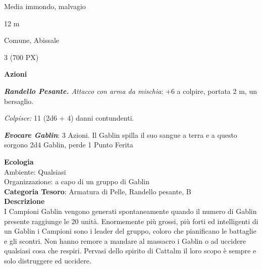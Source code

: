 \begin{multicols}{2}
{
\begin{description}[noitemsep, topsep=0pt, parsep=0pt, partopsep=0pt, itemsep=1pt, leftmargin=2.35cm,  labelwidth=2.2cm, itemindent=0cm, listparindent=0pt] %
\setlength{\baselineskip}{10pt}
\item[\textbf{Taglia/Tipo}] Media immondo, malvagio
\item[\textbf{Caratt.}] 
\item[\textbf{Punti Ferita}] 
\item[\textbf{Movimento}] 12 m
\item[\textbf{Tiri Salvez.}] 
\item[\textbf{Sensi}] 
\item[\textbf{Linguaggi}] Comune, Abissale
\item[\textbf{Sfida}] 3 (700 PX)
\end{description}
\smallskip

\textbf{Azioni}

\emph{\textbf{Randello Pesante.} Attacco con arma da mischia}: +6 a colpire, portata 2 m, un bersaglio.

\emph{Colpisce:} 11 (2d6 + 4) danni contundenti.

\emph{\textbf{Evocare Gablin}}: 3 Azioni. Il Gablin spilla il suo sangue a terra e a questo sorgono 2d4 Gablin, perde 1 Punto Ferita

\textbf{Ecologia}\\
Ambiente: Qualsiasi\\
Organizzazione: a capo di un gruppo di Gablin\\
\textbf{Categoria Tesoro}: Armatura di Pelle, Randello pesante, B\\
\textbf{Descrizione}\\
I Campioni Gablin vengono generati spontaneamente quando il numero di Gablin presente raggiunge le 20 unità. Enormemente più grossi, più forti ed intelligenti di un Gablin i Campioni sono i leader del gruppo, coloro che pianificano le battaglie e gli scontri.
Non hanno remore a mandare al massacro i Gablin o ad uccidere qualsiasi cosa che respiri. Pervasi dello spirito di Cattalm il loro scopo è sempre e solo distruggere ed uccidere.

}
\end{multicols}

